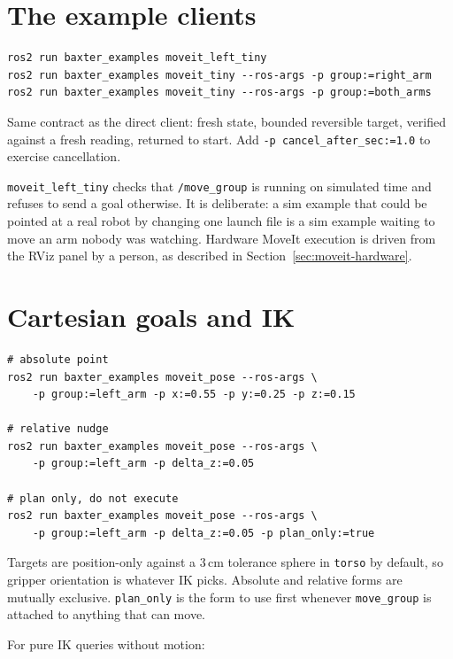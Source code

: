 \section{The example clients}

\begin{lstlisting}
ros2 run baxter_examples moveit_left_tiny
ros2 run baxter_examples moveit_tiny --ros-args -p group:=right_arm
ros2 run baxter_examples moveit_tiny --ros-args -p group:=both_arms
\end{lstlisting}

Same contract as the direct client: fresh state, bounded reversible target,
verified against a fresh reading, returned to start. Add
\texttt{-p cancel\_after\_sec:=1.0} to exercise cancellation.

\begin{notebox}
\texttt{moveit\_left\_tiny} checks that \texttt{/move\_group} is running on
simulated time and refuses to send a goal otherwise. It is deliberate: a sim
example that could be pointed at a real robot by changing one launch file is a
sim example waiting to move an arm nobody was watching. Hardware MoveIt execution
is driven from the RViz panel by a person, as described in
Section~\ref{sec:moveit-hardware}.
\end{notebox}

\section{Cartesian goals and IK}

\begin{lstlisting}
# absolute point
ros2 run baxter_examples moveit_pose --ros-args \
    -p group:=left_arm -p x:=0.55 -p y:=0.25 -p z:=0.15

# relative nudge
ros2 run baxter_examples moveit_pose --ros-args \
    -p group:=left_arm -p delta_z:=0.05

# plan only, do not execute
ros2 run baxter_examples moveit_pose --ros-args \
    -p group:=left_arm -p delta_z:=0.05 -p plan_only:=true
\end{lstlisting}

Targets are position-only against a 3\,cm tolerance sphere in \texttt{torso} by
default, so gripper orientation is whatever IK picks. Absolute and relative forms
are mutually exclusive. \texttt{plan\_only} is the form to use first whenever
\texttt{move\_group} is attached to anything that can move.

For pure IK queries without motion:

